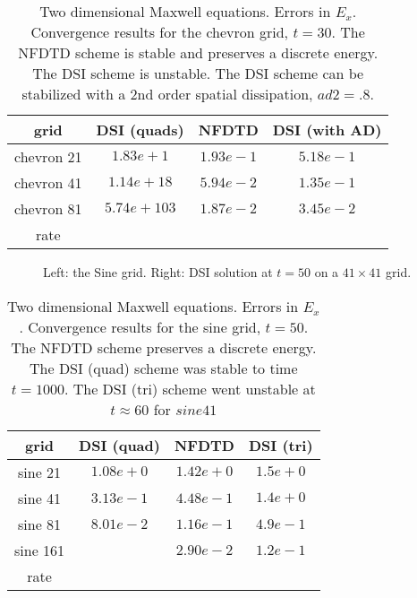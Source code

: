 \documentclass[10pt]{article}
\begin{document}
\begin{table}[hbt]
\begin{center}
\begin{tabular}{|c|c|c|c|} \hline 
  grid              &   DSI (quads)& NFDTD       &   DSI (with AD)  \\   \hline\hline 
  chevron 21        & $1.83e+1$   & $1.93e-1$  & $5.18e-1 $     \\ 
  chevron 41        & $1.14e+18$   & $5.94e-2$  & $1.35e-1 $     \\ 
  chevron 81        & $5.74e+103$  & $1.87e-2$  & $3.45e-2 $    \\ 
   rate             &              &             &                \\ \hline
\end{tabular}
\end{center}
\caption{Two dimensional Maxwell equations. Errors in $E_x$. Convergence results for the chevron grid, $t=30.$
       The NFDTD scheme is stable and preserves a discrete energy. The DSI scheme is unstable. The DSI scheme
   can be stabilized with a 2nd order spatial dissipation, $ad2=.8$.}
 \label{tab:conv chevron} 
\end{table}

\begin{figure}
\begin{center}
\end{center}
\caption{Left: the Sine grid. Right: DSI solution at $t=50$ on a $41\times 41$ grid.}
\end{figure}


\begin{table}[hbt]
\begin{center}
\begin{tabular}{|c|c|c|c|} \hline 
  grid            &   DSI (quad) & NFDTD       &   DSI (tri)   \\   \hline\hline 
  sine 21         & $1.08e+0$   & $1.42e+0$  & $1.5e+0$     \\ 
  sine 41         & $3.13e-1$   & $4.48e-1$  & $1.4e+0$     \\ 
  sine 81         & $8.01e-2$   & $1.16e-1$  & $4.9e-1$     \\ 
  sine 161        & $        $  & $2.90e-2$  & $1.2e-1$     \\ 
   rate           &             &             &                \\ \hline
\end{tabular}
\end{center}
\caption{Two dimensional Maxwell equations. Errors in $E_x$. Convergence results for the sine grid, $t=50.$
       The NFDTD scheme preserves a discrete energy. The DSI (quad) scheme was stable to time $t=1000$.
        The DSI (tri) scheme went unstable at $t\approx 60$ for $sine 41$}
 \label{tab:sine chevron} 
\end{table}
\end{document}
